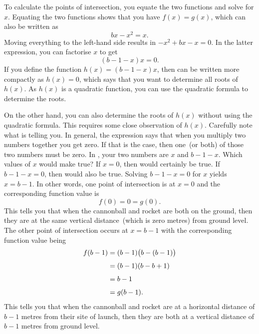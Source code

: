 \documentclass[a4paper,oneside,12pt]{article}
\begin{document}
\begin{problem}
{\begin{solution}
To calculate the points of intersection, you equate the two functions
and solve for $x$.  Equating the two functions shows that you have
$f(x) = g(x)$, which can also be written as
\[
bx - x^2
=
x.
\]
Moving everything to the left-hand side results in
$-x^2 + bx - x = 0$.  In the latter expression, you can factorise $x$
to get
\begin{equation}
\label{eqn:quadratic_point_of_intersection}
(b - 1 - x)x
=
0.
\end{equation}
If you define the function $h(x) = (b - 1 - x)x$, then
 can be written more
compactly as $h(x) = 0$, which says that you want to determine all
roots of $h(x)$.  As $h(x)$ is a quadratic function, you can use the
quadratic formula to determine the roots.

On the other hand, you can also determine the roots of $h(x)$ without
using the quadratic formula.  This requires some close observation of
$h(x)$.  Carefully note what
 is telling you.  In
general, the expression says that when you multiply two numbers
together you get zero.  If that is the case, then one~(or both) of
those two numbers must be zero.  In
, your two numbers are
$x$ and $b - 1 - x$.  Which values of $x$ would make
 true?  If $x = 0$,
then  would certainly
be true.  If $b - 1 - x = 0$, then
 would also be true.
Solving $b - 1 - x = 0$ for $x$ yields $x = b - 1$.  In other words,
one point of intersection is at $x = 0$ and the corresponding function
value is
\[
f(0)
=
0
=
g(0).
\]
This tells you that when the cannonball and rocket are both on the
ground, then they are at the same vertical distance~(which is zero
metres) from ground level.  The other point of intersection occurs at
$x = b - 1$ with the corresponding function value being
\begin{align*}
f(b - 1)
&=
(b - 1)\big(b - (b - 1)\big) \\[4pt]
&=
(b - 1) (b - b + 1) \\[4pt]
&=
b - 1 \\[4pt]
&=
g(b - 1).
\end{align*}
This tells you that when the cannonball and rocket are at a horizontal
distance of $b - 1$ metres from their site of launch, then they are
both at a vertical distance of $b - 1$ metres from ground level.
\end{solution}
}{}


\end{problem}
\end{document}

